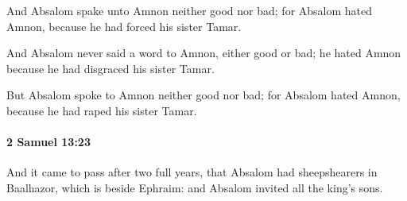 			\begin{versebox}
					\item[BHS] 
					\item[ASV] And Absalom spake unto Amnon neither good nor bad; for Absalom hated Amnon, because he had forced his sister Tamar.
					\item[NIV] And Absalom never said a word to Amnon, either good or bad; he hated Amnon because he had disgraced his sister Tamar.
					\item[NRSV] But Absalom spoke to Amnon neither good nor bad; for Absalom hated Amnon, because he had raped his sister Tamar.
			\end{versebox}

		\paragraph{2 Samuel 13:23} %
			\label{2SAMUEL-13-23}

			And it came to pass after two full years, that Absalom had sheepshearers in Baalhazor, which is beside Ephraim: and Absalom invited all the king’s sons.

